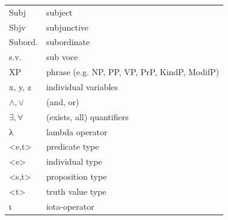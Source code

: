 \begin{tabularx}{\textwidth}{lQ}
Subj &  subject\\
Sbjv &  subjunctive\\
Subord. & subordinate\\
s.v. &  sub voce\\
XP &   phrase (e.g. NP, PP, VP, PrP, KindP, ModifP)\\
x, y, z & individual variables\\
$\wedge,\vee$    & (and, or)\\
$\exists,\forall$ &   (exists, all) quantifiers\\
λ &   lambda operator\\
<e,t> &   predicate type\\
<e> &   individual type\\
<s,t> &   proposition type\\
<t> &   truth value type\\
ι &   iota-operator\\
\end{tabularx}
